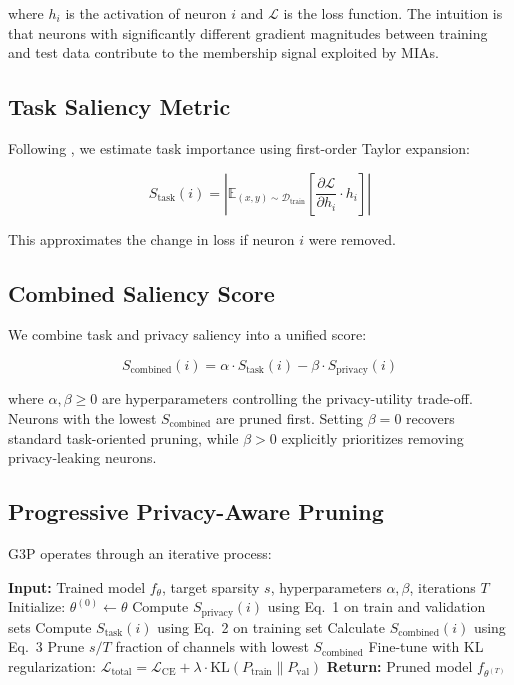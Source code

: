 \documentclass[11pt]{article}
\begin{document}
where $h_i$ is the activation of neuron $i$ and $\mathcal{L}$ is the loss function. The intuition is that neurons with significantly different gradient magnitudes between training and test data contribute to the membership signal exploited by MIAs.

\subsection{Task Saliency Metric}

Following \citet{molchanov2019importance}, we estimate task importance using first-order Taylor expansion:

\begin{equation}
S_{\text{task}}(i) = \left| \mathbb{E}_{(x,y) \sim \mathcal{D}_{\text{train}}} \left[ \frac{\partial \mathcal{L}}{\partial h_i} \cdot h_i \right] \right|
\end{equation}

This approximates the change in loss if neuron $i$ were removed.

\subsection{Combined Saliency Score}

We combine task and privacy saliency into a unified score:

\begin{equation}
S_{\text{combined}}(i) = \alpha \cdot S_{\text{task}}(i) - \beta \cdot S_{\text{privacy}}(i)
\end{equation}

where $\alpha, \beta \geq 0$ are hyperparameters controlling the privacy-utility trade-off. Neurons with the lowest $S_{\text{combined}}$ are pruned first. Setting $\beta = 0$ recovers standard task-oriented pruning, while $\beta > 0$ explicitly prioritizes removing privacy-leaking neurons.

\subsection{Progressive Privacy-Aware Pruning}

G3P operates through an iterative process:

\begin{algorithm}
\caption{G3P: Gradient-Guided Privacy-Preserving Pruning}
\begin{algorithmic}[1]
\STATE \textbf{Input:} Trained model $f_\theta$, target sparsity $s$, hyperparameters $\alpha, \beta$, iterations $T$
\STATE Initialize: $\theta^{(0)} \leftarrow \theta$
    \STATE Compute $S_{\text{privacy}}(i)$ using Eq.~1 on train and validation sets
    \STATE Compute $S_{\text{task}}(i)$ using Eq.~2 on training set
    \STATE Calculate $S_{\text{combined}}(i)$ using Eq.~3
    \STATE Prune $s/T$ fraction of channels with lowest $S_{\text{combined}}$
    \STATE Fine-tune with KL regularization: $\mathcal{L}_{\text{total}} = \mathcal{L}_{\text{CE}} + \lambda \cdot \text{KL}(P_{\text{train}} \| P_{\text{val}})$
\ENDFOR
\STATE \textbf{Return:} Pruned model $f_{\theta^{(T)}}$
\end{algorithmic}
\end{algorithm}
\end{document}
